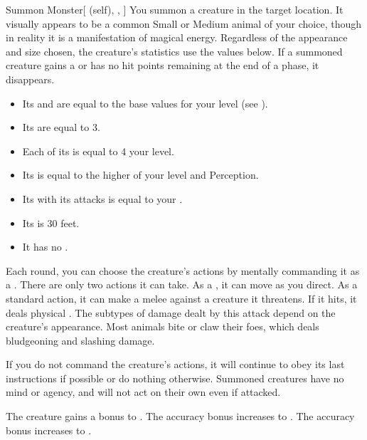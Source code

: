 \lowercase{\hypertarget{spell:Summon Monster}{}}\label{spell:Summon Monster}
\begin{attuneability}[Rank 1]{\hypertarget{spell:Summon Monster}{Summon Monster}}[ (self), , ]
You summon a creature in the target location.
It visually appears to be a common Small or Medium animal of your choice, though in reality it is a manifestation of magical energy.
Regardless of the appearance and size chosen, the creature's statistics use the values below.
If a summoned creature gains a  or has no hit points remaining at the end of a phase, it disappears.

\begin{itemize}
\item Its  and  are equal to the base values for your level (see ).
\item Its  are equal to 3.
\item Each of its  is equal to 4 \add your level.
\item Its  is equal to the higher of your level and Perception.
\item Its  with its attacks is equal to your  .
\item Its  is 30 feet.
\item It has no .
\end{itemize}

Each round, you can choose the creature's actions by mentally commanding it as a .
There are only two actions it can take.
As a , it can move as you direct.
As a standard action, it can make a melee  against a creature it threatens.
If it hits, it deals physical .
The subtypes of damage dealt by this attack depend on the creature's appearance.
Most animals bite or claw their foes, which deals bludgeoning and slashing damage.

If you do not command the creature's actions, it will continue to obey its last instructions if possible or do nothing otherwise.
Summoned creatures have no mind or agency, and will not act on their own even if attacked.

\rankline
{} The creature gains a  bonus to .
 The accuracy bonus increases to .
 The accuracy bonus increases to .
\end{attuneability}
\vspace{0.25em}



